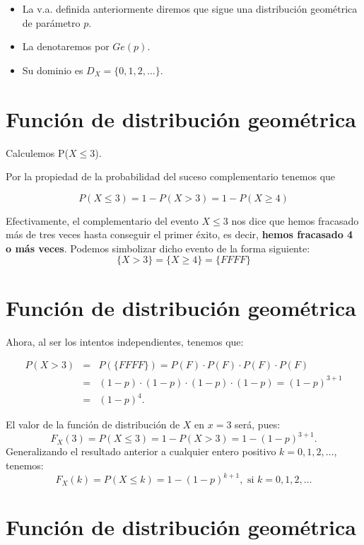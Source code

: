 \documentclass[
  letterpaper,
  DIV=11,
  numbers=noendperiod]{scrreprt}
\providecommand{\tightlist}{%
  \setlength{\itemsep}{0pt}\setlength{\parskip}{0pt}}\usepackage{longtable,booktabs,array}
\begin{document}
\begin{itemize}
\tightlist
\item
  La v.a. definida anteriormente diremos que sigue una distribución
  geométrica de parámetro \(p\).
\item
  La denotaremos por \(Ge(p)\).
\item
  Su dominio es \(D_X=\{0,1,2,\ldots\}\).
\end{itemize}

\section{Función de distribución
geométrica}\label{funciuxf3n-de-distribuciuxf3n-geomuxe9trica}

Calculemos P(\(X\leq 3\)).

Por la propiedad de la probabilidad del suceso complementario tenemos
que

\[
P(X\leq 3 )=1-P(X> 3)=1-P(X\geq 4)
\]

Efectivamente, el complementario del evento \(X\leq 3\) nos dice que
hemos fracasado más de tres veces hasta conseguir el primer éxito, es
decir, \textbf{hemos fracasado 4 o más veces}. Podemos simbolizar dicho
evento de la forma siguiente: \[
\{X>3\}=\{X\geq 4\}= \{FFFF\}
\]

\section{Función de distribución
geométrica}\label{funciuxf3n-de-distribuciuxf3n-geomuxe9trica-1}

Ahora, al ser los intentos independientes, tenemos que:

\begin{eqnarray*}
P(X>3) & = & P(\{FFFF\})= P(F)\cdot P(F)\cdot P(F)\cdot P(F)\\
&=& (1-p)\cdot (1-p)\cdot (1-p)\cdot (1-p)= (1-p)^{3+1}\\
&=&(1-p)^{4}.
\end{eqnarray*}

El valor de la función de distribución de \(X\) en \(x=3\) será, pues:
\[F_X(3)=P(X\leq 3)=1-P(X>3)=1-(1-p)^{3+1}.\] Generalizando el resultado
anterior a cualquier entero positivo \(k=0,1,2,\ldots\), tenemos:
\[F_X(k)=P(X\leq k)=1-(1-p)^{k+1},\mbox{ si } k=0,1,2,\ldots\]

\section{Función de distribución
geométrica}\label{funciuxf3n-de-distribuciuxf3n-geomuxe9trica-2}
\end{document}
